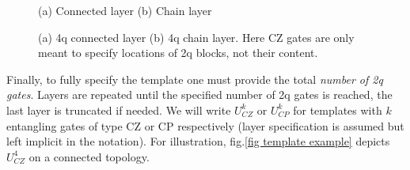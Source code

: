 \documentclass[amsfonts, amssymb, aps, nofootinbib, twocolumn]{revtex4-2}
\newcommand{\CZ}{CZ }
\newcommand{\CP}{CP }
\begin{document}
\begin{figure}
(a)	Connected layer \qquad\qquad(b) Chain layer
\\
\qquad\qquad
{}
\caption{(a) 4q connected layer (b) 4q chain layer. Here CZ gates are only meant to specify locations of 2q blocks, not their content. }
\label{fig layers}
\end{figure}

Finally, to fully specify the template one must provide the total \textit{number of 2q gates}. Layers are repeated until the specified number of 2q gates is reached, the last layer is truncated if needed. We will write $U^k_{CZ}$ or $U^k_{CP}$ for templates with $k$ entangling gates of type \CZ or \CP respectively (layer specification is assumed but left implicit in the notation). For illustration, fig.\ref{fig template example} depicts $U^4_{CZ}$ on a connected topology.
\end{document}
